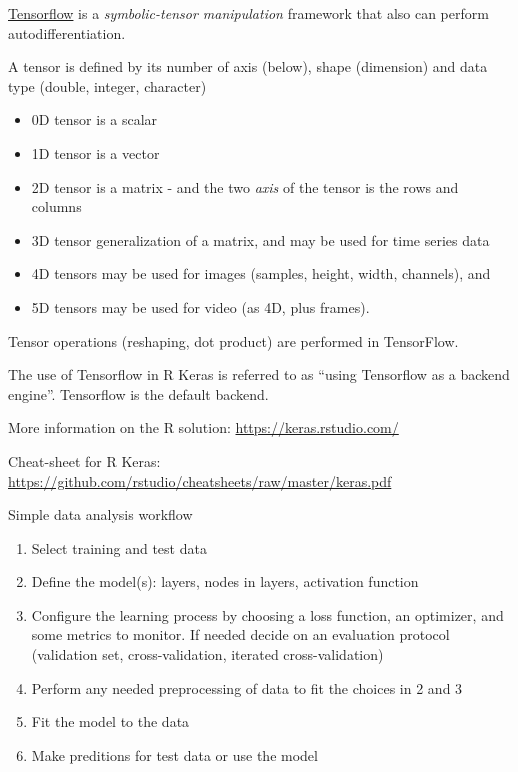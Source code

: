 \documentclass[10pt,ignorenonframetext,]{beamer}
\providecommand{\tightlist}{%
  \setlength{\itemsep}{0pt}\setlength{\parskip}{0pt}}
\begin{document}
\begin{frame}

\href{https://www.tensorflow.org/}{Tensorflow} is a
\emph{symbolic-tensor manipulation} framework that also can perform
autodifferentiation.

A tensor is defined by its number of axis (below), shape (dimension) and
data type (double, integer, character)

\begin{itemize}
\tightlist
\item
  0D tensor is a scalar
\item
  1D tensor is a vector
\item
  2D tensor is a matrix - and the two \emph{axis} of the tensor is the
  rows and columns
\item
  3D tensor generalization of a matrix, and may be used for time series
  data
\item
  4D tensors may be used for images (samples, height, width, channels),
  and
\item
  5D tensors may be used for video (as 4D, plus frames).
\end{itemize}

Tensor operations (reshaping, dot product) are performed in TensorFlow.

The use of Tensorflow in R Keras is referred to as ``using Tensorflow as
a backend engine''. Tensorflow is the default backend.

\end{frame}

\begin{frame}

More information on the R solution: \url{https://keras.rstudio.com/}

Cheat-sheet for R Keras:
\url{https://github.com/rstudio/cheatsheets/raw/master/keras.pdf}

\end{frame}

\begin{frame}

\begin{block}{Simple data analysis workflow}

\begin{enumerate}
\def\labelenumi{\arabic{enumi}.}
\tightlist
\item
  Select training and test data
\item
  Define the model(s): layers, nodes in layers, activation function
\item
  Configure the learning process by choosing a loss function, an
  optimizer, and some metrics to monitor. If needed decide on an
  evaluation protocol (validation set, cross-validation, iterated
  cross-validation)
\item
  Perform any needed preprocessing of data to fit the choices in 2 and 3
\item
  Fit the model to the data
\item
  Make preditions for test data or use the model
\end{enumerate}

\end{block}

\end{frame}
\end{document}
